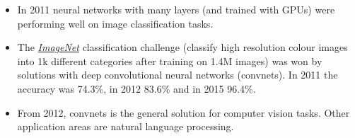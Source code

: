 \documentclass[10pt,ignorenonframetext,]{beamer}
\providecommand{\tightlist}{%
  \setlength{\itemsep}{0pt}\setlength{\parskip}{0pt}}
\begin{document}
\begin{frame}

\begin{itemize}
\tightlist
\item
  In 2011 neural networks with many layers (and trained with GPUs) were
  performing well on image classification tasks.
\end{itemize}

\vspace{2mm}

\begin{itemize}
\tightlist
\item
  The \href{http://www.image-net.org/}{\emph{ImageNet}} classification
  challenge (classify high resolution colour images into 1k different
  categories after training on 1.4M images) was won by solutions with
  deep convolutional neural networks (convnets). In 2011 the accuracy
  was 74.3\%, in 2012 83.6\% and in 2015 96.4\%.
\end{itemize}

\vspace{2mm}

\begin{itemize}
\tightlist
\item
  From 2012, convnets is the general solution for computer vision tasks.
  Other application areas are natural language processing.
\end{itemize}

\end{frame}
\end{document}
